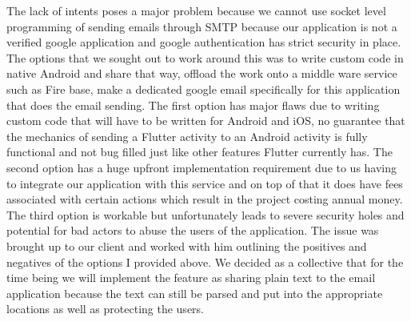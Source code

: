 \documentclass[onecolumn, draftclsnofoot,10pt, compsoc]{IEEEtran}
\begin{document}
The lack of intents poses a major problem because we cannot use socket level programming of sending emails through SMTP because our application is not a verified google application and google authentication has strict security in place. The options that we sought out to work around this was to write custom code in native Android and share that way, offload the work onto a middle ware service such as Fire base, make a dedicated google email specifically for this application that does the email sending. The first option has major flaws due to writing custom code that will have to be written for Android and iOS, no guarantee that the mechanics of sending a Flutter activity to an Android activity is fully functional and not bug filled just like other features Flutter currently has. The second option has a huge upfront implementation requirement due to us having to integrate our application with this service and on top of that it does have fees associated with certain actions which result in the project costing annual money. The third option is workable but unfortunately leads to severe security holes and potential for bad actors to abuse the users of the application. The issue was brought up to our client and worked with him outlining the positives and negatives of the options I provided above. We decided as a collective that for the time being we will implement the feature as sharing plain text to the email application because the text can still be parsed and put into the appropriate locations as well as protecting the users.
\end{document}
